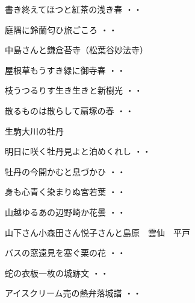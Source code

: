 \begin{shiika}書き終えてほつと紅茶の浅き春
\hfill{・・}\end{shiika}
\begin{shiika}庭隅に鈴蘭匂ひ旅ごころ
\hfill{・・}\end{shiika}
\vspace{0.6cm}
中島さんと鎌倉苔寺（松葉谷妙法寺）
\begin{shiika}屋根草もうすき緑に御寺春
\hfill{・・}\end{shiika}
\vspace{0.6cm}
\begin{shiika}枝うつるりす生き生きと新樹光
\hfill{・・}\end{shiika}
\vspace{0.6cm}
\begin{shiika}散るものは散らして扇塚の春
\hfill{・・}\end{shiika}
\vspace{0.6cm}
生駒大川の牡丹
\begin{shiika}明日に咲く牡丹見よと泊めくれし
\hfill{・・}\end{shiika}
\begin{shiika}牡丹の今開かむと息づかひ
\hfill{・・}\end{shiika}
\vspace{0.6cm}
\begin{shiika}身も心青く染まりぬ宮若葉
\hfill{・・}\end{shiika}
\begin{shiika}山越ゆるあの辺野崎か花曇
\hfill{・・}\end{shiika}
\vspace{0.6cm}
山下さん小森田さん悦子さんと島原　雲仙　平戸
\begin{shiika}バスの窓遠見を塞ぐ栗の花
\hfill{・・}\end{shiika}
\begin{shiika}蛇の衣板一枚の城跡文
\hfill{・・}\end{shiika}
\begin{shiika}アイスクリーム売の熱弁落城譜
\hfill{・・}\end{shiika}
